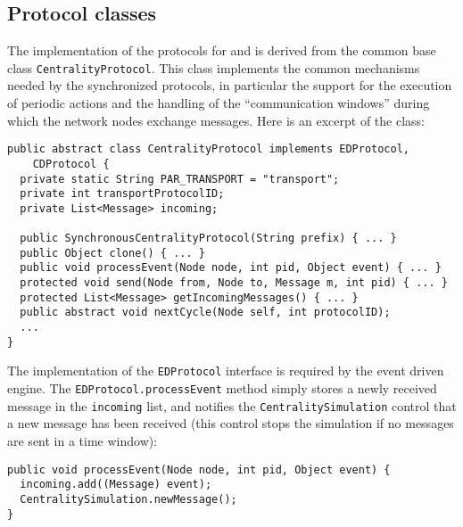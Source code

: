 \subsection{Protocol classes}

The implementation of the \peersim{} protocols for \deccen{} and \multibfs{} is derived from the common base class \texttt{CentralityProtocol}. This class implements the common mechanisms needed by the synchronized protocols, in particular the support for the execution of periodic actions and the handling of the ``communication windows'' during which the network nodes exchange messages. Here is an excerpt of the class:
\begin{verbatim}
public abstract class CentralityProtocol implements EDProtocol,
    CDProtocol {
  private static String PAR_TRANSPORT = "transport";
  private int transportProtocolID;
  private List<Message> incoming;
  
  public SynchronousCentralityProtocol(String prefix) { ... }
  public Object clone() { ... }
  public void processEvent(Node node, int pid, Object event) { ... }
  protected void send(Node from, Node to, Message m, int pid) { ... }
  protected List<Message> getIncomingMessages() { ... }
  public abstract void nextCycle(Node self, int protocolID);
  ...
}
\end{verbatim}

The implementation of the \texttt{EDProtocol} interface is required by the event driven engine. The \texttt{EDProtocol.processEvent} method simply stores a newly received message in the \texttt{incoming} list, and notifies the \texttt{CentralitySimulation} control that a new message has been received (this control stops the simulation if no messages are sent in a time window):
\begin{verbatim}
public void processEvent(Node node, int pid, Object event) {
  incoming.add((Message) event);
  CentralitySimulation.newMessage();
}
\end{verbatim}

